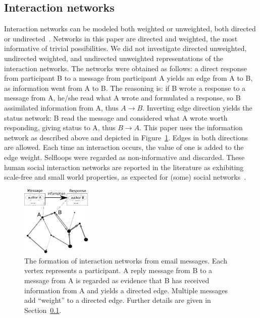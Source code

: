 \documentclass[%
	aip,
	jmp,%
	amsmath,amssymb,
	reprint,%
]{revtex4-1}
\begin{document}
\subsection{Interaction networks}\label{intNet}
Interaction networks can be modeled both weighted or unweighted, both directed or undirected~\cite{bird,newmanCommunityDirected,newmanCommunity2013}.
Networks in this paper are directed and weighted, the most informative of trivial possibilities. We did not investigate directed unweighted, undirected weighted, and undirected unweighted representations of the interaction networks. 
The networks were obtained as follows: a direct response from participant B to a message from participant A yields an edge from A to B, as information went from A to B. The reasoning is: if B wrote a response to a message from A, he/she read what A wrote and formulated a response, so B assimilated information from A, thus $A \rightarrow B$. Inverting edge direction yields the status network: B read the message and considered what A wrote worth responding, giving status to A, thus $B\rightarrow A$. This paper uses the information network as described above and depicted in Figure~\ref{formationNetwork}. Edges in both directions are allowed. Each time an interaction occurs, the value of one is added to the edge weight. Selfloops were regarded as non-informative and discarded. These human social interaction networks are reported in the literature as exhibiting scale-free and small world properties, as expected for (some) social networks~\cite{bird,newmanBook}.

\begin{figure}[!h]
	\centering
	\includegraphics[width=0.3\textwidth]{figs/criaRede__}
	\caption{The formation of interaction networks from email messages. Each vertex represents a participant. A reply message from B to a message from A is regarded as evidence that B has received information from A and yields a directed edge. Multiple messages add ``weight'' to a directed edge. Further details are given in Section~\ref{intNet}.}
	\label{formationNetwork}
\end{figure}
\end{document}

